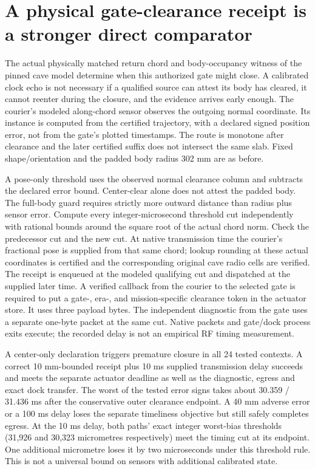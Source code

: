\documentclass{article}
\begin{document}
\section*{A physical gate-clearance receipt is a stronger direct comparator}
The actual physically matched return chord and body-occupancy witness
of the pinned cave model determine when this authorized gate might
close. A calibrated clock echo is not necessary if a qualified source
can attest its body has cleared, it cannot reenter during the closure,
and the evidence arrives early enough. The courier's modeled
along-chord sensor observes the outgoing normal coordinate. Its
instance is computed from the certified trajectory, with a declared
signed position error, not from the gate's plotted timestamps.
The route is monotone after clearance and the later certified suffix
does not intersect the same slab. Fixed shape/orientation and the
padded body radius 302 mm are as before.

A pose-only threshold uses the observed normal clearance column
and subtracts the declared error bound. Center-clear alone does not
attest the padded body. The full-body guard requires strictly more
outward distance than radius plus sensor error. Compute every
integer-microsecond threshold cut independently with rational
bounds around the square root of the actual chord norm. Check
the predecessor cut and the new cut. At native transmission time
the courier's fractional pose is supplied from that same chord;
lookup rounding at these actual coordinates is certified and the
corresponding original cave radio cells are verified. The receipt is
enqueued at the modeled qualifying cut and dispatched at the supplied
later time. A verified callback from the courier to the selected gate
is required to put a gate-, era-, and mission-specific clearance token
in the actuator store. It uses three payload bytes. The independent
diagnostic from the gate uses a separate one-byte packet at the same
cut. Native packets and gate/dock process exits execute; the recorded
delay is not an empirical RF timing measurement.

A center-only declaration triggers premature closure in all 24
tested contexts. A correct 10 mm-bounded receipt plus 10 ms supplied
transmission delay succeeds and meets the separate actuator deadline
as well as the diagnostic, egress and exact dock transfer. The worst
of the tested error signs takes about 30.359 / 31.436 ms after the
conservative outer clearance endpoint. A 40 mm adverse error or a
100 ms delay loses the separate timeliness objective but still safely
completes egress. At the 10 ms delay, both paths' exact integer
worst-bias thresholds (31,926 and 30,323 micrometres respectively)
meet the timing cut at its endpoint. One additional micrometre
loses it by two microseconds under this threshold rule. This is
not a universal bound on sensors with additional calibrated state.
\end{document}
